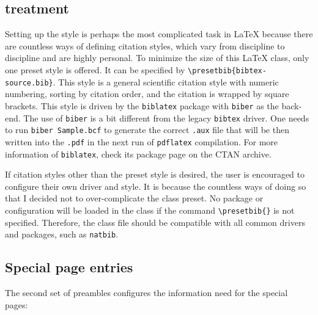 \documentclass[draft]{emory}
\begin{document}
\subsection{\BibTeX{} treatment}
Setting up the \BibTeX{} style is perhaps the most complicated task in \LaTeX{} 
because there are countless ways of defining citation styles, which vary from 
discipline to discipline and are highly personal.
To minimize the size of this \LaTeX{} class, only one preset \BibTeX{} style
is offered. It can be specified by \Verb|\presetbib{bibtex-source.bib}|.
This style is a general scientific citation style with numeric numbering, 
sorting by citation order, and the citation is wrapped by square brackets. 
This style is driven by the \Verb|biblatex| package with \Verb|biber| as the 
back-end. 
The use of \Verb|biber| is a bit different from the legacy \Verb|bibtex| driver.
One needs to run \Verb|biber Sample.bcf| to generate the correct \Verb|.aux| 
file that will be then written into the \Verb|.pdf| in the next run of 
\Verb|pdflatex| compilation. For more information of \Verb|biblatex|, check its 
package page on the CTAN archive. 

If citation styles other than the preset style is desired, the user is 
encouraged to configure their own \BibTeX{} driver and style.
It is because the countless ways of doing so that I decided not to 
over-complicate the class preset.
No \BibTeX{} package or configuration will be loaded in the class if the 
command \Verb|\presetbib{}| is not specified. 
Therefore, the class file should be compatible with all common \BibTeX{} 
drivers and packages, such as \Verb|natbib|. 


\subsection{Special page entries}
The second set of preambles configures the information need for the special pages:
\end{document}
